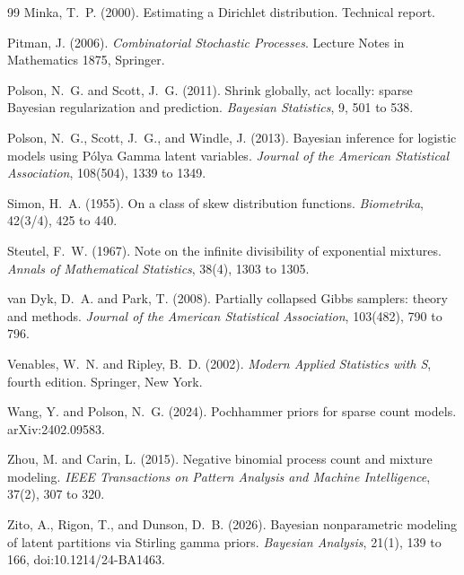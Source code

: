 \begin{thebibliography}{99}
Minka, T.~P. (2000). Estimating a Dirichlet distribution. Technical report.

Pitman, J. (2006). \emph{Combinatorial Stochastic Processes}. Lecture Notes in Mathematics 1875, Springer.

Polson, N.~G. and Scott, J.~G. (2011). Shrink globally, act locally: sparse Bayesian regularization and prediction. \emph{Bayesian Statistics}, 9, 501 to 538.

Polson, N.~G., Scott, J.~G., and Windle, J. (2013). Bayesian inference for logistic models using P\'olya Gamma latent variables. \emph{Journal of the American Statistical Association}, 108(504), 1339 to 1349.

Simon, H.~A. (1955). On a class of skew distribution functions. \emph{Biometrika}, 42(3/4), 425 to 440.

Steutel, F.~W. (1967). Note on the infinite divisibility of exponential mixtures. \emph{Annals of Mathematical Statistics}, 38(4), 1303 to 1305.

van Dyk, D.~A. and Park, T. (2008). Partially collapsed Gibbs samplers: theory and methods. \emph{Journal of the American Statistical Association}, 103(482), 790 to 796.

Venables, W.~N. and Ripley, B.~D. (2002). \emph{Modern Applied Statistics with S}, fourth edition. Springer, New York.

Wang, Y. and Polson, N.~G. (2024). Pochhammer priors for sparse count models. arXiv:2402.09583.

Zhou, M. and Carin, L. (2015). Negative binomial process count and mixture modeling. \emph{IEEE Transactions on Pattern Analysis and Machine Intelligence}, 37(2), 307 to 320.

Zito, A., Rigon, T., and Dunson, D.~B. (2026). Bayesian nonparametric modeling of latent partitions via Stirling gamma priors. \emph{Bayesian Analysis}, 21(1), 139 to 166, doi:10.1214/24\nobreakdash-BA1463.

\end{thebibliography}

